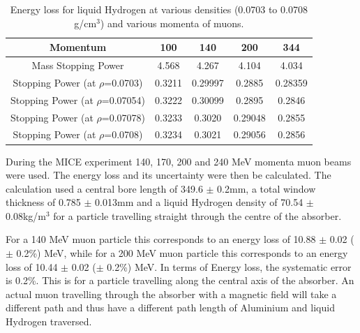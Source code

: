 \begin{table}
  \caption{
    Energy loss for liquid Hydrogen at various densities (0.0703 to 0.0708 g/cm${}^{3}$) and various momenta of muons.
  }
  \label{tab:Hydrogen}
  \begin{center}
    \begin{tabular}{|c c c c c|}
    \hline

Momentum & 100 & 140 & 200 & 344     \rule{0pt}{14pt} \\
\hline
{Mass Stopping Power} & 4.568 & 4.267 & 4.104 & 4.034 \\
{Stopping Power }(at $\rho$=0.0703)\textbf{} & 0.3211 & 0.29997 & 0.2885 & 0.28359\\
{Stopping Power }(at $\rho$=0.07054)\textbf{} & 0.3222 & 0.30099 & 0.2895 & 0.2846 \\
{Stopping Power }(at $\rho$=0.07078)\textbf{} & 0.3233 & 0.3020 & 0.29048 & 0.2855 \\
{Stopping Power }(at $\rho$=0.0708)\textbf{} & 0.3234 & 0.3021 & 0.29056 & 0.2856 \\
    \hline
    \end{tabular}
  \end{center}
\end{table} 


 During the MICE experiment 140, 170, 200 and 240 MeV momenta muon beams were used. The energy loss and its uncertainty were then be calculated. The calculation used a central bore length of 349.6 $\mathrm{\pm}$ 0.2mm, a total window thickness of 0.785 $\mathrm{\pm}$ 0.013mm and a liquid Hydrogen density of 70.54 $\mathrm{\pm}$ 0.08kg/m${}^{3}$ for a particle travelling straight through the centre of the absorber.

 For a 140 MeV muon particle this corresponds to an energy loss of 10.88 $\mathrm{\pm}$ 0.02 ($\mathrm{\pm}$ 0.2\%) MeV, while for a 200 MeV muon particle this corresponds to an energy loss of 10.44 $\mathrm{\pm}$ 0.02 ($\mathrm{\pm}$ 0.2\%) MeV. In terms of Energy loss, the systematic error is 0.2\%. This is for a particle travelling along the central axis of the absorber. An actual muon travelling through the absorber with a magnetic field will take a different path and thus have a different path length of Aluminium and liquid Hydrogen traversed.
 

